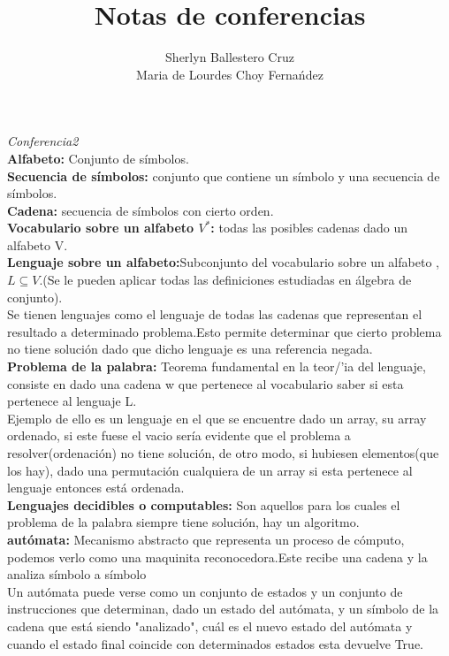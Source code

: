 \documentclass[12pt,a4paper]{article}
\title{Notas de conferencias}
\author{Sherlyn Ballestero Cruz \\ Maria de Lourdes Choy Ferna\'ndez}
\begin{document}
\maketitle
\newpage
\pagestyle{myheadings}
\textit{Conferencia2}\\
\textbf{Alfabeto:} Conjunto de s\'imbolos.\\
\textbf{Secuencia de s\'imbolos:} conjunto que contiene un s\'imbolo y una secuencia de s\'imbolos.\\
\textbf{Cadena:} secuencia de s\'imbolos con cierto orden.\\
\textbf{Vocabulario sobre un alfabeto $V^{*}$:} todas las posibles cadenas dado un alfabeto V.\\
\textbf{Lenguaje sobre un alfabeto:}Subconjunto del vocabulario sobre un alfabeto  ,$L \subseteq V
$.(Se le pueden aplicar todas las definiciones estudiadas en \'algebra de conjunto).\\
Se tienen lenguajes como  el lenguaje de todas las cadenas que representan el resultado a determinado problema.Esto  permite determinar que cierto problema no tiene soluci\'on dado que dicho lenguaje es una referencia negada.\\
\textbf{Problema de la palabra:}
Teorema fundamental en la teor/'ia del lenguaje, consiste en dado una cadena w que pertenece al vocabulario saber si esta pertenece al lenguaje L.\\
Ejemplo de ello es un lenguaje en el que se encuentre dado un array, su array ordenado, si este fuese el vacio ser\'ia evidente que el problema a resolver(ordenaci\'on) no tiene soluci\'on, de otro modo, si hubiesen elementos(que los hay), dado una permutaci\'on cualquiera de un array si esta pertenece al lenguaje entonces est\'a ordenada.\\
\textbf{Lenguajes decidibles o computables:}
Son aquellos para los cuales el problema de la palabra siempre tiene soluci\'on, hay un algoritmo.\\
\textbf{aut\'omata:}
Mecanismo abstracto que representa un proceso de c\'omputo, podemos verlo como una maquinita reconocedora.Este recibe una cadena y la analiza s\'imbolo a s\'imbolo \\
Un aut\'omata puede verse como un conjunto de estados y un conjunto de instrucciones que determinan, dado un estado del aut\'omata, y un s\'imbolo de la cadena que est\'a siendo "analizado", cu\'al es el nuevo estado del aut\'omata y cuando el estado final coincide con determinados estados esta devuelve True.\\
\end{document}

